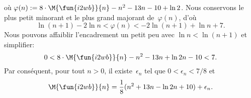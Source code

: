 où \(\varphi(n) := 8 \cdot \M{\fun{i2wb}}{n} - n^2 - 13n - 10 + \ln
2\). Nous conservons le plus petit minorant et le plus grand majorant
de~\(\varphi(n)\), d'où
\begin{equation*}
\ln(n+1) - 2\ln n < \varphi(n) < -2\ln(n+1) + \ln n + 7.
\end{equation*}
Nous pouvons affaiblir l'encadrement un petit peu avec \(\ln n <
\ln(n+1)\) et simplifier:
\begin{equation*}
0 < 8 \cdot \M{\fun{i2wb}}{n} - n^2 - 13n + \ln 2n - 10 < 7.
\end{equation*}
Par conséquent, pour tout \(n > 0\), il existe~\(\epsilon_n\) tel que
\(0 < \epsilon_n < 7/8\) et
\begin{equation}
\M{\fun{i2wb}}{n}
  = \frac{1}{8}(n^2 + 13n - \ln 2n + 10) + \epsilon_n.
\label{eq_ave_i2wb}
\end{equation}
